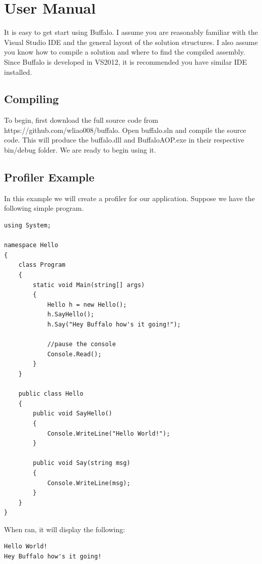 \chapter{User Manual}

It is easy to get start using Buffalo. I assume you are reasonably familiar with the Visual Studio IDE and the general layout of the solution structures. I also assume you know how to compile a solution and where to find the compiled assembly. Since Buffalo is developed in VS2012, it is recommended you have similar IDE installed.

\section{Compiling}
To begin, first download the full source code from https://github.com/wliao008/buffalo. Open buffalo.sln and compile the source code. This will produce the buffalo.dll and BuffaloAOP.exe in their respective bin/debug folder. We are ready to begin using it.

\section{Profiler Example}
In this example we will create a profiler for our application. Suppose we have the following simple program.

\begin{lstlisting}[caption={Hello program}, label=helloprogram, frame=tb, basicstyle=\scriptsize]
using System;

namespace Hello
{
    class Program
    {
        static void Main(string[] args)
        {
            Hello h = new Hello();
            h.SayHello();
            h.Say("Hey Buffalo how's it going!");

            //pause the console
            Console.Read();
        }
    }

    public class Hello
    {
        public void SayHello()
        {
            Console.WriteLine("Hello World!");
        }

        public void Say(string msg)
        {
            Console.WriteLine(msg);
        }
    }
}
\end{lstlisting}

When ran, it will display the following:
\begin{lstlisting}[caption={Hello program output}, label=helloout, frame=tb, basicstyle=\scriptsize]
Hello World!
Hey Buffalo how's it going!
\end{lstlisting}

